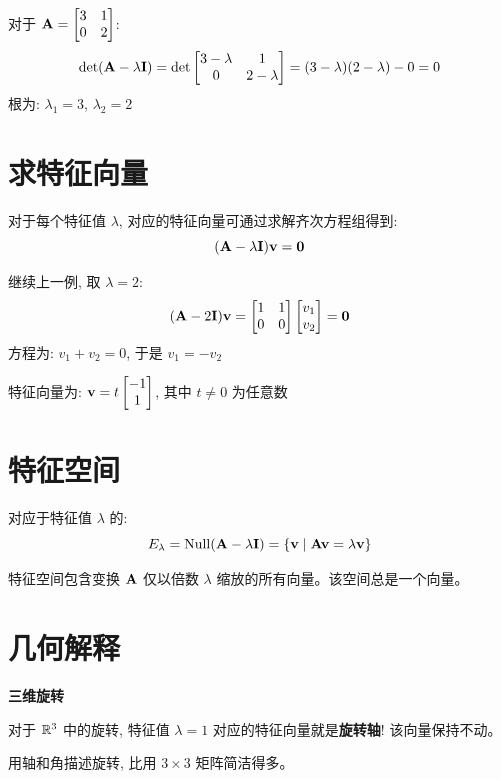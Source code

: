 \begin{example}
对于 $\mathbf{A} = \begin{bmatrix} 3 & 1 \\ 0 & 2 \end{bmatrix}$:
\[
\det(\mathbf{A} - \lambda\mathbf{I}) = \det\begin{bmatrix} 3-\lambda & 1 \\ 0 & 2-\lambda \end{bmatrix} = (3-\lambda)(2-\lambda) - 0 = 0
\]
根为: $\lambda_1 = 3$, $\lambda_2 = 2$
\end{example}

\section{求特征向量}

\begin{theorem}
对于每个特征值 $\lambda$, 对应的特征向量可通过求解齐次方程组得到:
\[
(\mathbf{A} - \lambda\mathbf{I})\mathbf{v} = \mathbf{0}
\]
\end{theorem}

\begin{example}
继续上一例, 取 $\lambda = 2$:
\[
(\mathbf{A} - 2\mathbf{I})\mathbf{v} = \begin{bmatrix} 1 & 1 \\ 0 & 0 \end{bmatrix}\begin{bmatrix} v_1 \\ v_2 \end{bmatrix} = \mathbf{0}
\]
方程为: $v_1 + v_2 = 0$, 于是 $v_1 = -v_2$

特征向量为: $\mathbf{v} = t\begin{bmatrix} -1 \\ 1 \end{bmatrix}$, 其中 $t \neq 0$ 为任意数
\end{example}

\section{特征空间}

\begin{definition}[特征空间]
对应于特征值 $\lambda$ 的:
\[
E_\lambda = \operatorname{Null}(\mathbf{A} - \lambda\mathbf{I}) = \{\mathbf{v} \mid \mathbf{A}\mathbf{v} = \lambda\mathbf{v}\}
\]
\end{definition}

\begin{intuition}
特征空间包含变换 $\mathbf{A}$ 仅以倍数 $\lambda$ 缩放的所有向量。该空间总是一个向量。
\end{intuition}

\section{几何解释}

\begin{practical}
\textbf{三维旋转}

对于 $\mathbb{R}^3$ 中的旋转, 特征值 $\lambda = 1$ 对应的特征向量就是\textbf{旋转轴}! 该向量保持不动。

用轴和角描述旋转, 比用 $3 \times 3$ 矩阵简洁得多。
\end{practical}


